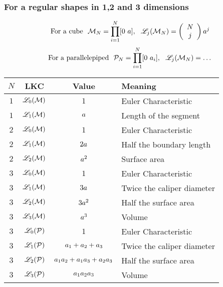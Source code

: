 \documentclass[12pt]{article}
\begin{document}
\subsubsection{For a regular shapes in 1,2 and 3 dimensions}
\begin{equation}
  \text{For a cube} \ \ \MRF_N=\prod_{i=1}^{N}[0\ \Msize], \ \ \LKC_j(\MRF_N)= \left( \begin{array}{c} N \\ j \end{array} \right) \Msize^j
\end{equation}
\begin{equation}
  \text{For a parallelepiped} \ \ \PRF_N=\prod_{i=1}^{N}[0\ \Msize_i], \ \ \LKC_j(\MRF_N)= \dots
\end{equation}
\begin{center}
  \begin{tabular}{c|c|c|l}
    $N$ & LKC & Value & Meaning \\
    \hline
    $1$ & $\mathscr{L}_0(\mathcal{M})$ & $1$ & Euler Characteristic \\
    $1$ & $\mathscr{L}_1(\mathcal{M})$ & $a$ & Length of the segment \\
    \hline
    $2$ & $\mathscr{L}_0(\mathcal{M})$ & $1$ & Euler Characteristic \\
    $2$ & $\mathscr{L}_1(\mathcal{M})$ & $2a$ & Half the boundary length \\
    $2$ & $\mathscr{L}_2(\mathcal{M})$ & $a^2$ & Surface area \\
    \hline
    $3$ & $\mathscr{L}_0(\mathcal{M})$ & $1$ & Euler Characteristic \\
    $3$ & $\mathscr{L}_1(\mathcal{M})$ & $3a$ & Twice the caliper diameter \\
    $3$ & $\mathscr{L}_2(\mathcal{M})$ & $3a^2$ & Half the surface area \\
    $3$ & $\mathscr{L}_3(\mathcal{M})$ & $a^3$ & Volume \\
    \hline
    $3$ & $\mathscr{L}_0(\mathcal{P})$ & $1$ & Euler Characteristic \\
    $3$ & $\mathscr{L}_1(\mathcal{P})$ & $a_1+a_2+a_3$ & Twice the caliper diameter \\
    $3$ & $\mathscr{L}_2(\mathcal{P})$ & $a_1a_2+a_1a_3+a_2a_3$ & Half the surface area \\
    $3$ & $\mathscr{L}_3(\mathcal{P})$ & $a_1a_2a_3$ & Volume \\
  \end{tabular}
\end{center}
\end{document}
